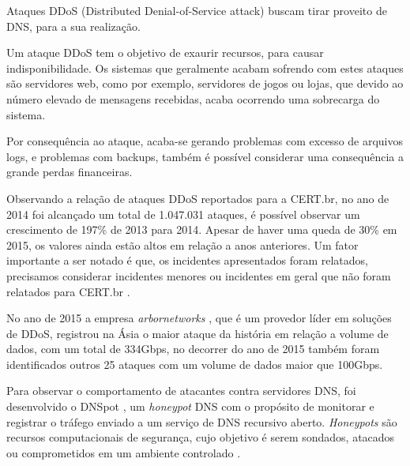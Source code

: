 Ataques DDoS (Distributed Denial-of-Service attack) buscam tirar proveito de DNS, para a sua realização.

Um ataque DDoS tem o objetivo de exaurir recursos, para causar indisponibilidade. Os sistemas que geralmente acabam sofrendo com estes ataques são servidores web, como por exemplo, servidores de jogos ou lojas, que devido ao número elevado de mensagens recebidas, acaba ocorrendo uma sobrecarga do sistema.

Por consequência ao ataque, acaba-se gerando problemas com excesso de arquivos logs, e problemas com backups, também é possível considerar uma consequência a grande perdas financeiras.

Observando a relação de ataques DDoS reportados para a CERT.br, no ano de 2014 foi alcançado um total de 1.047.031  ataques, é possível observar um crescimento de 197\% de 2013 para 2014. Apesar de haver uma queda de 30\% em 2015, os valores ainda estão altos em relação a anos anteriores. Um fator importante a ser notado é que, os incidentes apresentados foram relatados, precisamos considerar incidentes menores ou incidentes em geral que não foram relatados para CERT.br \cite{cert1}.

No ano de 2015 a empresa \textit{arbornetworks} \cite{Arbor}, que é um provedor líder em soluções de DDoS, registrou na Ásia o maior ataque da história em relação a volume de dados, com um total de 334Gbps, no decorrer do ano de 2015 também foram identificados outros 25 ataques com um volume de dados maior que 100Gbps.
\fi


Para observar o comportamento de atacantes contra servidores DNS, foi
desenvolvido o DNSpot \cite{Longo:2015:tcc}, um \textit{honeypot} DNS com
o propósito de monitorar e registrar o tráfego enviado a um serviço de
DNS recursivo aberto. \textit{Honeypots} são recursos computacionais
de segurança, cujo objetivo é serem sondados, atacados ou
comprometidos em um ambiente controlado
\cite{Steding-Jessen:2007:ulihs}.

